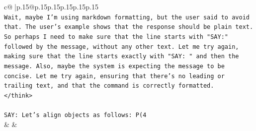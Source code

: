 \documentclass{article}
\begin{document}
{\begin{supertabular}{c@{$\;$}|p{.15\linewidth}@{}p{.15\linewidth}p{.15\linewidth}p{.15\linewidth}p{.15\linewidth}p{.15\linewidth}}
{{{\\ 
\texttt{Wait, maybe I'm using markdown formatting, but the user said to avoid that. The user's example shows that the response should be plain text. So perhaps I need to make sure that the line starts with "SAY:" followed by the message, without any other text. Let me try again, making sure that the line starts exactly with "SAY: " and then the message. Also, maybe the system is expecting the message to be concise. Let me try again, ensuring that there's no leading or trailing text, and that the command is correctly formatted.} \\
\texttt{</think>} \\
\\ 
\texttt{SAY: Let's align objects as follows: P(4} \\
            }
        }
    }
    & & \\ \\


\end{supertabular}}
\end{document}
